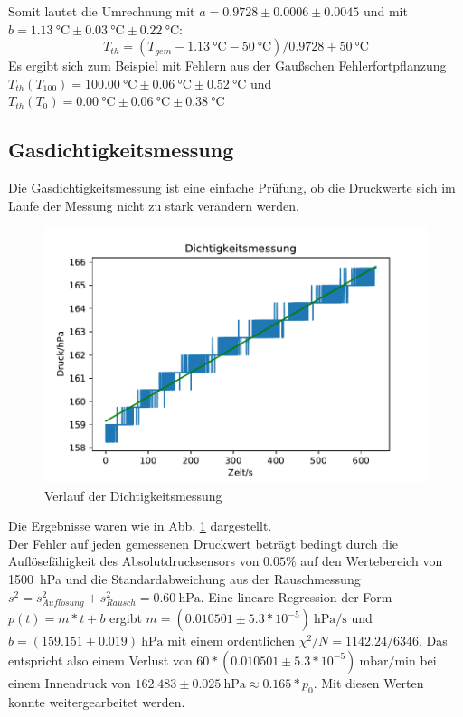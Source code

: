 \documentclass[]{article}
\begin{document}
	Somit lautet die Umrechnung
	mit $a = 0.9728 \pm 0.0006 \pm 0.0045$
	und mit $b = \SI{1.13}{\celsius} \pm \SI{0.03}{\celsius} \pm \SI{0.22}{\celsius}$:
	\begin{equation}
	T_{th} = (T_{gem}-\SI{1.13}{\celsius}-\SI{50}{\celsius})/0.9728 + \SI{50}{\celsius}
	\label{Kalibrierung}
	\end{equation}
	Es ergibt sich zum Beispiel mit Fehlern aus der Gaußschen Fehlerfortpflanzung $T_{th}(T_{100}) = \SI{100.00}{\celsius} \pm  \SI{0.06}{\celsius} \pm \SI{0.52}{\celsius}$
	und $T_{th}(T_0) = \SI{0.00}{\celsius} \pm \SI{0.06}{\celsius} \pm \SI{0.38}{\celsius}$
	\\
	\subsection{Gasdichtigkeitsmessung}
	Die Gasdichtigkeitsmessung ist eine einfache Prüfung, ob die Druckwerte sich im Laufe der Messung nicht zu stark verändern werden.
	\begin{figure}
		\begin{center}
			\includegraphics[scale=0.9]{Images/Kalib_Dichtigkeitsmessung.pdf}
			\caption{Verlauf der Dichtigkeitsmessung}
			\label{GD_data}
		\end{center}
	\end{figure}
	Die Ergebnisse waren wie in Abb. \ref{GD_data} dargestellt. \\
	Der Fehler auf jeden gemessenen Druckwert beträgt bedingt durch die Auflösefähigkeit des Absolutdrucksensors von $0.05\%$ auf den Wertebereich von \SI{1500}{\hecto \pascal} und die
	Standardabweichung aus der Rauschmessung $s^{2} = s^{2}_{Aufl\ddot{o}sung}+s^{2}_{Rausch} = \SI{0.60}{\hecto \pascal}$. 
	Eine lineare Regression der Form $p(t)=m*t+b$ ergibt $m = (0.010501 \pm 5.3*10^{-5})\SI{}{\hecto \pascal/ \second}$ und $b = (159.151 \pm 0.019)\SI{}{\hecto \pascal}$ mit einem ordentlichen $\chi ^{2}/N=1142.24 / 6346$. Das entspricht also einem Verlust von $60*(0.010501 \pm 5.3*10^{-5})\SI{}{\milli \bar / \minute}$ bei einem Innendruck von $162.483 \pm 0.025 \SI{}{\hecto \pascal} \approx 0.165*p_0$. Mit diesen Werten konnte weitergearbeitet werden.
\end{document}
